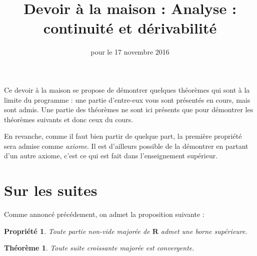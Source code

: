 \documentclass[12pt,a4paper,french]{article}
\title{Devoir à la maison \no{2} : Analyse : continuité et dérivabilité}
\author{\bsc{Ts 3}}
\date{pour le 17 novembre 2016}
\makeatletter
\renewcommand{\maketitle}%
{\framebox{%
    \begin{minipage}{1.0\linewidth}%
      \begin{center}%
        \Large \@title ~-- \@author \\%
        \@date%
      \end{center}%
    \end{minipage}}%
  \normalsize%
}
\newcommand{\R}{\mathbf{R}}
\theoremstyle{break}
\newtheorem{propriete}{Propriété}
\newtheorem{theoreme}{Théorème}
\theoremstyle{plain}
\theoremstyle{nonumberplain}
\theoremstyle{nonumberbreak}
\makeatother
\begin{document}
\maketitle

\bigskip

Ce devoir à la maison se propose de démontrer quelques théorèmes qui
sont à la limite du programme : une partie d'entre-eux vous sont
présentés en cours, mais sont admis. Une partie des théorèmes ne sont
ici présents que pour démontrer les théorèmes suivants et donc ceux du
cours.

En revanche, comme il faut bien partir de quelque part, la première
propriété sera admise comme \emph{axiome}. Il est d'ailleurs possible de
la démontrer en partant d'un autre axiome, c'est ce qui est fait dans
l'enseignement supérieur.

\section{Sur les suites}

Comme annoncé précédement, on admet la proposition suivante :

\begin{propriete}
  Toute partie non-vide majorée de $\R$ admet une borne supérieure.
\end{propriete}

\begin{theoreme}
  Toute suite croissante majorée est convergente.
\end{theoreme}
\end{document}
